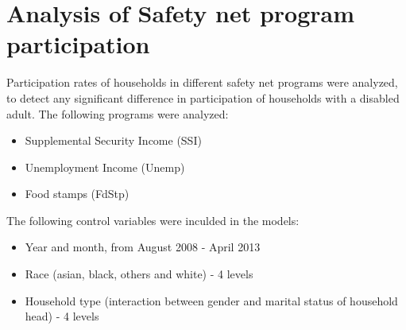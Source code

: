 \documentclass[11pt]{extarticle} %
\begin{document}
\section{Analysis of Safety net program participation}
Participation rates of households in different safety net programs were analyzed, to detect any significant difference in participation of households with a disabled adult. The following programs were analyzed:
\begin{itemize}
\item Supplemental Security Income (SSI)
\item Unemployment Income (Unemp)
\item Food stamps (FdStp)
\end{itemize}

The following control variables were inculded in the models:
\begin{itemize}
\item Year and month, from August 2008 - April 2013
\item Race (asian, black, others and white) - 4 levels
\item Household type (interaction between gender and marital status of household head) - 4 levels
\end{itemize}
\end{document}
